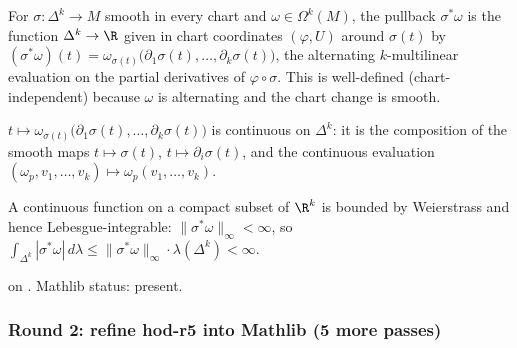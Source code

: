 \begin{lemma}
\label{lem:dis-r7}
For $\sigma : \Delta^{k} \to M$ smooth in every chart and $\omega \in \Omega^{k}(M)$, the pullback $\sigma^{*}\omega$ is the function $\Delta^{k} \to \R$ given in chart coordinates $(\varphi, U)$ around $\sigma(t)$ by $(\sigma^{*}\omega)(t) = \omega_{\sigma(t)}\bigl(\partial_{1}\sigma(t),\ldots,\partial_{k}\sigma(t)\bigr)$, the alternating $k$-multilinear evaluation on the partial derivatives of $\varphi\circ\sigma$.  This is well-defined (chart-independent) because $\omega$ is alternating and the chart change is smooth.
\leanok
\end{lemma}

\begin{lemma}
\label{lem:dis-r8}
$t \mapsto \omega_{\sigma(t)}\bigl(\partial_{1}\sigma(t),\ldots,\partial_{k}\sigma(t)\bigr)$ is continuous on $\Delta^{k}$: it is the composition of the smooth maps $t\mapsto\sigma(t)$, $t\mapsto\partial_{i}\sigma(t)$, and the continuous evaluation $(\omega_{p}, v_{1}, \ldots, v_{k}) \mapsto \omega_{p}(v_{1}, \ldots, v_{k})$.
\leanok
\end{lemma}

\begin{lemma}
\label{lem:dis-r9}
A continuous function on a compact subset of $\R^{k}$ is bounded by Weierstrass and hence Lebesgue-integrable: $\|\sigma^{*}\omega\|_{\infty} < \infty$, so $\int_{\Delta^{k}} |\sigma^{*}\omega|\,d\lambda \le \|\sigma^{*}\omega\|_{\infty}\cdot\lambda(\Delta^{k}) < \infty$.
\leanok
\end{lemma}

\begin{lemma}
\label{lem:dis-r10}
 on .  Mathlib status: present.
\leanok\mathlibok
\end{lemma}

\subsubsection*{Round 2: refine hod-r5 into Mathlib (5 more passes)}

